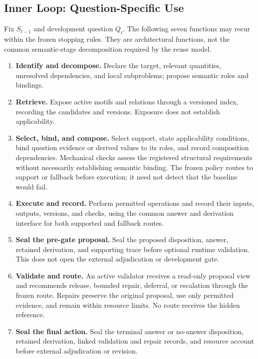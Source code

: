 \documentclass[10pt]{article} %
\providecommand{\1}{\mathbf{1}}  %
\theoremstyle{remark}
\theoremstyle{definition}
\begin{document}
\subsection{Inner Loop: Question-Specific Use}
\label{subsec:courtroom-inner-loop}

Fix $S_{t-1}$ and development question $Q_t$. The following seven
functions may recur within the frozen stopping rules. They are
architectural functions, not the common semantic-stage decomposition
required by the reuse model.

\begin{enumerate}
\item \textbf{Identify and decompose.}
Declare the target, relevant quantities, unresolved dependencies, and
local subproblems; propose semantic roles and bindings.

\item \textbf{Retrieve.}
Expose active motifs and relations through a versioned index, recording
the candidates and versions. Exposure does not establish applicability.

\item \textbf{Select, bind, and compose.}
Select support, state applicability conditions, bind question evidence or
derived values to its roles, and record composition dependencies.
Mechanical checks assess the registered structural requirements without
necessarily establishing semantic binding. The frozen policy routes to
support or fallback before execution; it need not detect that the
baseline would fail.

\item \textbf{Execute and record.}
Perform permitted operations and record their inputs, outputs, versions,
and checks, using the common answer and derivation interface for both
supported and fallback routes.

\item \textbf{Seal the pre-gate proposal.}
Seal the proposed disposition, answer, retained derivation, and supporting
trace before optional runtime validation. This does not open the external
adjudication or development gate.

\item \textbf{Validate and route.}
An active validator receives a read-only proposal view and recommends
release, bounded repair, deferral, or escalation through the frozen route.
Repairs preserve the original proposal, use only permitted evidence, and
remain within resource limits. No route receives the hidden reference.

\item \textbf{Seal the final action.}
Seal the terminal answer or no-answer disposition, retained derivation,
linked validation and repair records, and resource account before
external adjudication or revision.
\end{enumerate}
\end{document}
